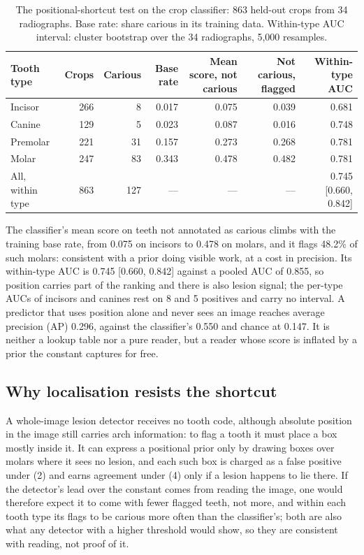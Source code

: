 \documentclass[conference]{IEEEtran}
\begin{document}
\begin{table}[t]
\centering
\caption{The positional-shortcut test on the crop classifier: 863 held-out crops from 34 radiographs. Base rate: share carious in its training data. Within-type AUC interval: cluster bootstrap over the 34 radiographs, 5,000 resamples.}
\label{tab:2}
\footnotesize
\setlength{\tabcolsep}{3pt}
\begin{tabular}{>{\raggedright\arraybackslash}p{3.80cm}rrrrrr}
\toprule
Tooth type & Crops & Carious & Base rate & Mean score, not carious & Not carious, flagged & Within-type AUC \\
\midrule
Incisor & 266 & 8 & 0.017 & 0.075 & 0.039 & 0.681 \\
Canine & 129 & 5 & 0.023 & 0.087 & 0.016 & 0.748 \\
Premolar & 221 & 31 & 0.157 & 0.273 & 0.268 & 0.781 \\
Molar & 247 & 83 & 0.343 & 0.478 & 0.482 & 0.781 \\
All, within type & 863 & 127 & — & — & — & 0.745 [0.660, 0.842] \\
\bottomrule
\end{tabular}
\end{table}

The classifier's mean score on teeth not annotated as carious climbs with the training base rate, from 0.075 on incisors to 0.478 on molars, and it flags 48.2\% of such molars: consistent with a prior doing visible work, at a cost in precision. Its within-type AUC is 0.745 [0.660, 0.842] against a pooled AUC of 0.855, so position carries part of the ranking and there is also lesion signal; the per-type AUCs of incisors and canines rest on 8 and 5 positives and carry no interval. A predictor that uses position alone and never sees an image reaches average precision (AP) 0.296, against the classifier's 0.550 and chance at 0.147. It is neither a lookup table nor a pure reader, but a reader whose score is inflated by a prior the constant captures for free.

\subsection{Why localisation resists the shortcut}

A whole-image lesion detector receives no tooth code, although absolute position in the image still carries arch information: to flag a tooth it must place a box mostly inside it. It can express a positional prior only by drawing boxes over molars where it sees no lesion, and each such box is charged as a false positive under (2) and earns agreement under (4) only if a lesion happens to lie there. If the detector's lead over the constant comes from reading the image, one would therefore expect it to come with fewer flagged teeth, not more, and within each tooth type its flags to be carious more often than the classifier's; both are also what any detector with a higher threshold would show, so they are consistent with reading, not proof of it.
\end{document}
